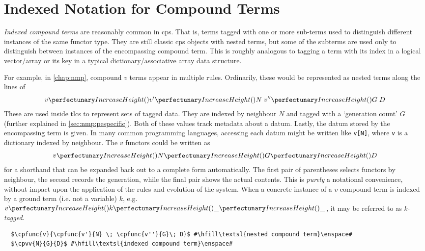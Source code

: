 \section{\label{sec:cps:compoundterms}Indexed Notation for Compound Terms}

\emph{Indexed compound terms} are reasonably common in \gls{cps}.  That is, terms tagged with one or more sub-terms used to distinguish different instances of the same \gls{functor} type.  They are still classic \gls{cps} objects with nested terms, but some of the subterms are used only to distinguish between instances of the encompassing compound term.  This is roughly analogous to tagging a term with its index in a logical vector/array or its key in a typical dictionary/associative array data structure.

For example, in \cref{chap:nmp}, compound \(v\) terms appear in multiple rules.  Ordinarily, these would be represented as nested terms along the lines of
\[ \cpfunc{v}{\cpfunc{v'}{N} \; \cpfunc{v''}{G}\; D} \]
These are used inside \glspl{tlc} to represent sets of tagged data.  They are indexed by neighbour \(N\) and tagged with a `generation count' \(G\) (further explained in \cref{sec:nmp:pespecific}).  Both of these values track metadata about a datum.  Lastly, the datum stored by the encompassing term is given.  In many common programming languages, accessing each datum might be written like \texttt{v[N]}, where \texttt{v} is a dictionary indexed by neighbour.  The \(v\) \glspl{functor} could be written as \[ \cpvv{N}{G}{D} \] for a shorthand that can be expanded back out to a complete form automatically.  The first pair of parentheses selects \glspl{functor} by neighbour, the second records the generation, while the final pair shows the actual contents.  This is \emph{purely} a notational convenience, without impact upon the application of the rules and evolution of the system.  When a concrete instance of a \(v\) compound term is indexed by a ground term (i.e. not a variable) \(k\), e.g. \(\cpvv{k}{\_}{\_}\), it may be referred to as \emph{k-tagged}.

\lstset{xleftmargin=.5in, xrightmargin=.5in} 
\begin{lstlisting}
  $\cpfunc{v}{\cpfunc{v'}{N} \; \cpfunc{v''}{G}\; D}$ #\hfill\textsl{nested compound term}\enspace#
  $\cpvv{N}{G}{D}$ #\hfill\textsl{indexed compound term}\enspace#
\end{lstlisting}